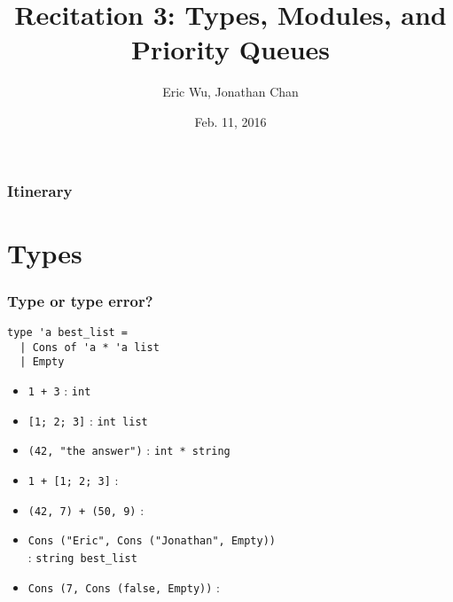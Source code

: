 \documentclass{beamer}
\title[Recitation 3]{Recitation 3: Types, Modules, and Priority Queues }
\author{Eric Wu, Jonathan Chan}
\institute[Cornell] { CS 3110 }
\date{Feb. 11, 2016}
\newcommand{\redx}{{\color{red} \ding{55}}}
\begin{document}
\begin{frame}
\titlepage
\end{frame}

\begin{frame}
\frametitle{Itinerary}
\tableofcontents
\end{frame}

\section{Types}

\begin{frame}[fragile]
\frametitle{Type or type error?}

\begin{lstlisting}
type 'a best_list =
  | Cons of 'a * 'a list
  | Empty
\end{lstlisting}
\pause

\begin{itemize}
\item \verb|1 + 3| \pause : \verb|int| \pause
\item \verb|[1; 2; 3]| \pause : \verb|int list| \pause
\item \verb|(42, "the answer")| \pause : \verb|int * string| \pause
\item \verb|1 + [1; 2; 3]| \pause : \redx \pause
\item \verb|(42, 7) + (50, 9)| \pause : \redx \pause
\item \verb|Cons ("Eric", Cons ("Jonathan", Empty))| \pause \\: \verb|string best_list| \pause
\item \verb|Cons (7, Cons (false, Empty))| \pause : \redx
\end{itemize}
\end{frame}
\end{document}
